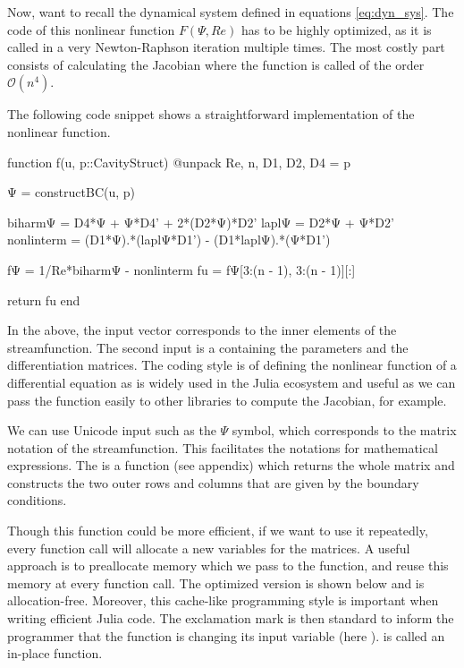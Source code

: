 Now, want to recall the dynamical system defined in equations \eqref{eq:dyn_sys}.
The code of this nonlinear function $F(\Psi, Re)$ has to be highly optimized,
as it is called in a very Newton-Raphson iteration multiple times. The most
costly part consists of calculating the Jacobian where the function is called
of the order $\mathcal{O}(n^4)$.

The following code snippet shows a straightforward implementation of the
nonlinear function. 

\clearpage


\begin{jllisting}[caption=Simple implementation in Julia of the nonlinear function $F$]
function f(u, p::CavityStruct)
    @unpack Re, n, D1, D2, D4 = p

    Ψ = constructBC(u, p)

    biharmΨ = D4*Ψ +  Ψ*D4' + 2*(D2*Ψ)*D2'
    laplΨ = D2*Ψ + Ψ*D2'
    nonlinterm = (D1*Ψ).*(laplΨ*D1') - (D1*laplΨ).*(Ψ*D1')
    
    fΨ = 1/Re*biharmΨ - nonlinterm
    fu = fΨ[3:(n - 1), 3:(n - 1)][:]

    return fu 
end
\end{jllisting}

In the above, the input vector  corresponds to the inner elements of
the streamfunction. The second input  is a 
containing the parameters and the differentiation matrices. The coding style is
of defining the nonlinear function of a differential equation as 
is widely used in the Julia ecosystem and useful as we can pass the function
easily to other libraries to compute the Jacobian, for example.

We can use Unicode input such as the $\Psi $ symbol, which corresponds to the
matrix notation of the streamfunction. This facilitates the notations for
mathematical expressions. The  is a function (see
appendix) which returns the whole matrix and constructs the two outer rows and
columns that are given by the boundary conditions.

Though this function could be more efficient, if we want to use it repeatedly,
every function call will allocate a new variables for the matrices. A useful
approach is to preallocate memory which we pass to the function, and reuse this
memory at every function call. The optimized version is shown below and is
allocation-free. Moreover, this cache-like programming style is important when
writing efficient Julia code. The exclamation mark is then standard to inform
the programmer that the function is changing its input variable (here
).  is called an in-place function.


